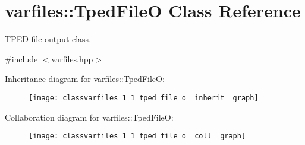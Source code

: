 \hypertarget{classvarfiles_1_1_tped_file_o}{}\section{varfiles\+:\+:Tped\+FileO Class Reference}
\label{classvarfiles_1_1_tped_file_o}


T\+P\+ED file output class.  




{\ttfamily \#include $<$varfiles.\+hpp$>$}



Inheritance diagram for varfiles\+:\+:Tped\+FileO\+:\nopagebreak
\begin{figure}[H]
\begin{center}
\leavevmode
\texttt{[image: classvarfiles\_1\_1\_tped\_file\_o\_\_inherit\_\_graph]}
\end{center}
\end{figure}


Collaboration diagram for varfiles\+:\+:Tped\+FileO\+:\nopagebreak
\begin{figure}[H]
\begin{center}
\leavevmode
\texttt{[image: classvarfiles\_1\_1\_tped\_file\_o\_\_coll\_\_graph]}
\end{center}
\end{figure}

